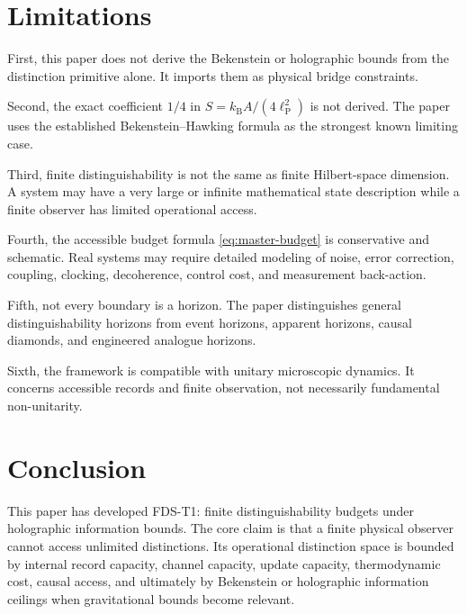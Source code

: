 \documentclass[10pt,a4paper,twocolumn,aps,prl]{revtex4-2}
\newcommand{\ellP}{\ell_{\mathrm P}}
\newcommand{\kB}{k_{\mathrm B}}
\begin{document}
\section{Limitations}

First, this paper does not derive the Bekenstein or holographic bounds from the distinction primitive alone. It imports them as physical bridge constraints.

Second, the exact coefficient $1/4$ in $S=\kB A/(4\ellP^2)$ is not derived. The paper uses the established Bekenstein--Hawking formula as the strongest known limiting case.

Third, finite distinguishability is not the same as finite Hilbert-space dimension. A system may have a very large or infinite mathematical state description while a finite observer has limited operational access.

Fourth, the accessible budget formula \eqref{eq:master-budget} is conservative and schematic. Real systems may require detailed modeling of noise, error correction, coupling, clocking, decoherence, control cost, and measurement back-action.

Fifth, not every boundary is a horizon. The paper distinguishes general distinguishability horizons from event horizons, apparent horizons, causal diamonds, and engineered analogue horizons.

Sixth, the framework is compatible with unitary microscopic dynamics. It concerns accessible records and finite observation, not necessarily fundamental non-unitarity.

\section{Conclusion}

This paper has developed FDS-T1: finite distinguishability budgets under holographic information bounds. The core claim is that a finite physical observer cannot access unlimited distinctions. Its operational distinction space is bounded by internal record capacity, channel capacity, update capacity, thermodynamic cost, causal access, and ultimately by Bekenstein or holographic information ceilings when gravitational bounds become relevant.
\end{document}
